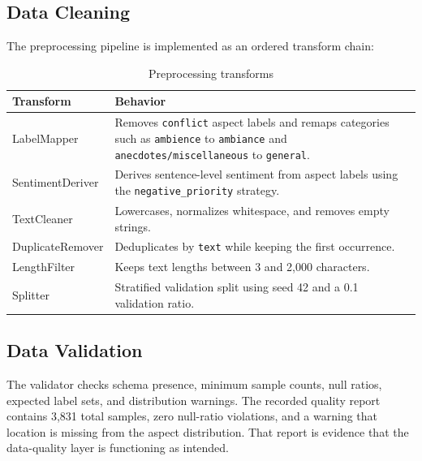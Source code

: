 \documentclass[12pt, a4paper]{article}
\begin{document}
\subsection{Data Cleaning}
The preprocessing pipeline is implemented as an ordered transform chain:
\begin{table}[H]
\centering
\caption{Preprocessing transforms}
\begin{tabularx}{\textwidth}{@{} p{3.2cm} X @{}}
\toprule
\textbf{Transform} & \textbf{Behavior} \\
\midrule
LabelMapper & Removes \texttt{conflict} aspect labels and remaps categories such as \texttt{ambience} to \texttt{ambiance} and \texttt{anecdotes/miscellaneous} to \texttt{general}. \\
SentimentDeriver & Derives sentence-level sentiment from aspect labels using the \texttt{negative_priority} strategy. \\
TextCleaner & Lowercases, normalizes whitespace, and removes empty strings. \\
DuplicateRemover & Deduplicates by \texttt{text} while keeping the first occurrence. \\
LengthFilter & Keeps text lengths between 3 and 2,000 characters. \\
Splitter & Stratified validation split using seed 42 and a 0.1 validation ratio. \\
\bottomrule
\end{tabularx}
\end{table}

\subsection{Data Validation}
The validator checks schema presence, minimum sample counts, null ratios, expected label sets, and distribution warnings. The recorded quality report contains 3,831 total samples, zero null-ratio violations, and a warning that location is missing from the aspect distribution. That report is evidence that the data-quality layer is functioning as intended.
\end{document}
